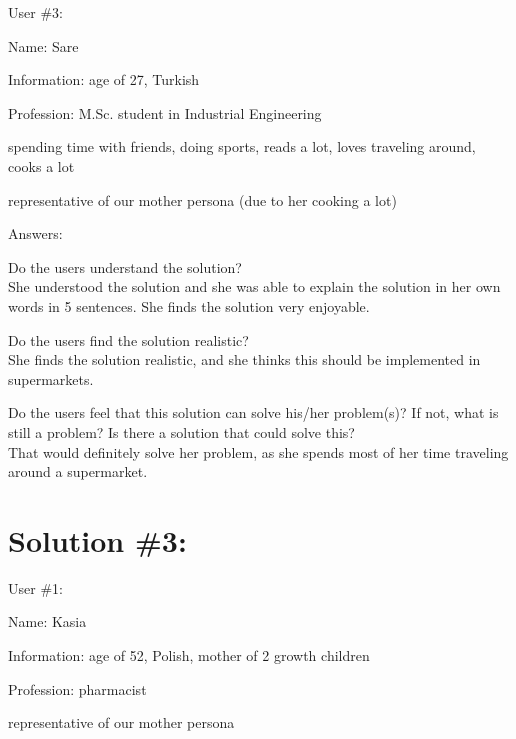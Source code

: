 \documentclass[a4paper,10pt,oneside]{scrreprt}
\begin{document}
User \#3:
\begin{compactitem}
	\item Name: Sare
	\item Information: age of 27, Turkish
	\item Profession: M.Sc. student in Industrial Engineering
	\item spending time with friends, doing sports, reads a lot, loves traveling around, cooks a lot  
	\item representative of our mother persona (due to her cooking a lot)
\end{compactitem}
\bigskip

Answers:
\begin{compactitem}
	\item Do the users understand the solution?\\
	She understood the solution and she was able to explain the solution in her own words in 5 sentences. She finds the solution very enjoyable.\\
	
	
	\item Do the users find the solution realistic?\\
	She finds the solution realistic, and she thinks this should be implemented in supermarkets.\\
	
	\item Do the users feel that this solution can solve his/her problem(s)? If not, what is still
	a problem? Is there a solution that could solve this?\\
	That would definitely solve her problem, as she spends most of her time traveling around a supermarket.\\
\end{compactitem}
\bigskip



\clearpage
\section{Solution \#3:}
User \#1:
\begin{compactitem}
	\item Name: Kasia
	\item Information: age of 52, Polish, mother of 2 growth children
	\item Profession: pharmacist
	\item representative of our mother persona
\end{compactitem}
\bigskip
\end{document}
